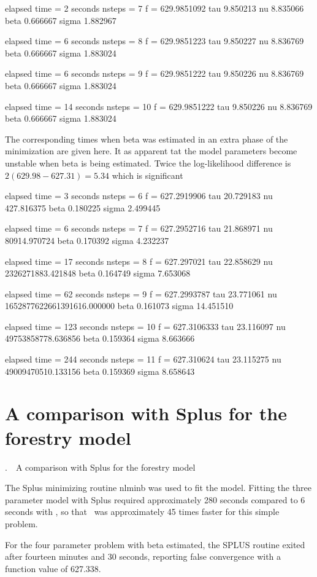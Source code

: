 \documentclass[12pt]{book}
\makeatletter
\def\mysection#1{\section{#1}{\bigbf \medbreak\noindent\number\c@chapter.\number\c@section\ \ #1\medbreak}}
\makeatother
\begin{document}
elapsed time = 2 seconds nsteps = 7 f = 629.9851092
tau 9.850213 nu 8.835066 beta 0.666667 sigma 1.882967

elapsed time = 6 seconds nsteps = 8 f = 629.9851223
tau 9.850227 nu 8.836769 beta 0.666667 sigma 1.883024

elapsed time = 6 seconds nsteps = 9 f = 629.9851222
tau 9.850226 nu 8.836769 beta 0.666667 sigma 1.883024

elapsed time = 14 seconds nsteps = 10 f = 629.9851222
tau 9.850226 nu 8.836769 beta 0.666667 sigma 1.883024
\endexample

The corresponding times when beta was estimated in an extra
phase of the minimization are given here. 
It as apparent tat the model parameters become unstable when
beta is being estimated.  Twice the log-likelihood difference
is $2(629.98-627.31)=5.34$ which is significant

\beginexample

elapsed time = 3 seconds nsteps = 6 f = 627.2919906
tau 20.729183 nu 427.816375 beta 0.180225 sigma 2.499445

elapsed time = 6 seconds nsteps = 7 f = 627.2952716
tau 21.868971 nu 80914.970724 beta 0.170392 sigma 4.232237

elapsed time = 17 seconds nsteps = 8 f = 627.297021
tau 22.858629 nu 2326271883.421848 beta 0.164749 sigma 7.653068

elapsed time = 62 seconds nsteps = 9 f = 627.2993787
tau 23.771061 nu 1652877622661391616.000000 beta 0.161073 sigma 14.451510

elapsed time = 123 seconds nsteps = 10 f = 627.3106333
tau 23.116097 nu 49753858778.636856 beta 0.159364 sigma 8.663666

elapsed time = 244 seconds nsteps = 11 f = 627.310624
tau 23.115275 nu 49009470510.133156 beta 0.159369 sigma 8.658643

\endexample

\mysection{A comparison with Splus for the forestry model}

The Splus minimizing routine nlminb was used to fit the model.
Fitting the three parameter model with Splus required
approximately 280 seconds compared to 6 seconds with \ADM,
so that \ADM\ was approximately 45 times faster for this simple problem.

For the four parameter problem with beta estimated,
the SPLUS routine exited after
fourteen minutes and 30 seconds, reporting false convergence
with a function value of 627.338.
\end{document}
